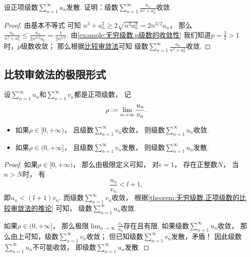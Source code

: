 \begin{example}
设正项级数\(\sum_{n=1}^\infty a_n\)发散.
证明：级数\(\sum_{n=1}^\infty \frac{a_n}{n^3+a_n^2}\)收敛.
\begin{proof}
由基本不等式  可知
\(n^3+a_n^2\geq2\sqrt{n^3 a_n^2}=2n^{3/2}a_n\)，
那么\(\frac{a_n}{n^3+a_n^2}\leq\frac{a_n}{2n^{3/2}a_n}=\frac{1}{2n^{3/2}}\).
由\cref{example:无穷级数.p级数的收敛性}
我们知道\(p=\frac{3}{2}>1\)时，\(p\)级数收敛；
那么根据\hyperref[theorem:无穷级数.正项级数的比较审敛法]{比较审敛法}可知
级数\(\sum_{n=1}^\infty \frac{a_n}{n^3+a_n^2}\)收敛.
\end{proof}
\end{example}

\subsection{比较审敛法的极限形式}
\begin{theorem}[比较审敛法的极限形式]\label{theorem:无穷级数.正项级数的比较审敛法的极限形式}
设\(\sum_{n=1}^\infty u_n\)和\(\sum_{n=1}^\infty v_n\)都是正项级数，
记\[
	\rho
	:=
	\lim_{n\to\infty} \frac{u_n}{v_n}.
\]
\begin{itemize}
	\item 如果\(\rho\in[0,+\infty)\)，
	且级数\(\sum_{n=1}^\infty v_n\)收敛，
	则级数\(\sum_{n=1}^\infty u_n\)收敛.

	\item 如果\(\rho\in(0,+\infty]\)，
	且级数\(\sum_{n=1}^\infty v_n\)发散，
	则级数\(\sum_{n=1}^\infty u_n\)发散.
\end{itemize}
\begin{proof}
如果\(\rho\in[0,+\infty)\)，
那么由极限定义可知，
对\(\epsilon=1\)，
存在正整数\(N\)，
当\(n>N\)时，
有\[
	\frac{u_n}{v_n} < l+1,
\]
即\(u_n < (l+1) v_n\).
而级数\(\sum_{n=1}^\infty v_n\)收敛，
根据\cref{theorem:无穷级数.正项级数的比较审敛法的推论} 可知，
级数\(\sum_{n=1}^\infty u_n\)收敛.

如果\(\rho\in(0,+\infty]\)，
那么极限\(\lim_{n\to\infty} \frac{v_n}{u_n}\)存在且有限.
如果级数\(\sum_{n=1}^\infty u_n\)收敛，
那么由上可知，级数\(\sum_{n=1}^\infty v_n\)收敛；
但已知级数\(\sum_{n=1}^\infty v_n\)发散，矛盾！
因此级数\(\sum_{n=1}^\infty u_n\)不可能收敛，
即级数\(\sum_{n=1}^\infty u_n\)发散.
\end{proof}
\end{theorem}


